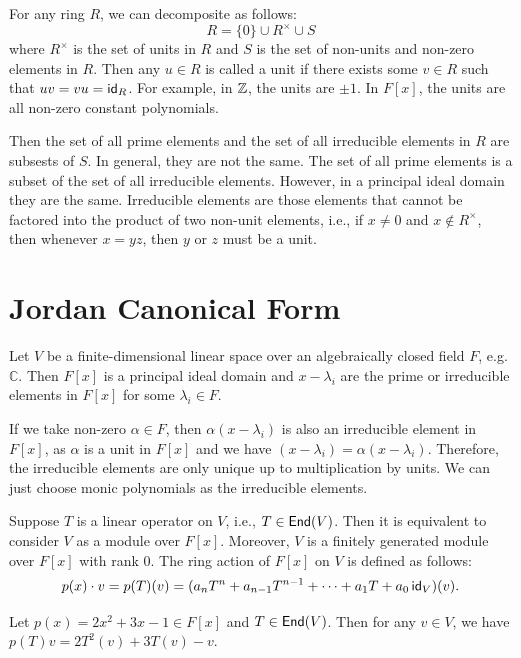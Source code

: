 For any ring $R$, we can decomposite as follows:
\[
  R = \{ 0 \} \cup R^{\times} \cup S
\]
where $R^{\times}$ is the set of units in $R$ and $S$ is the set of non-units and non-zero elements in $R$. Then any $u \in R$ is called a unit if there exists some $v \in R$ such that $uv = vu = \operatorname{\text{\normalfont\sffamily id}}_R$. For example, in $\operatorname{\mathbb{Z}}$, the units are $\pm 1$. In $F[x]$, the units are all non-zero constant polynomials.

Then the set of all prime elements and the set of all irreducible elements in $R$ are subsests of $S$. In general, they are not the same. The set of all prime elements is a subset of the set of all irreducible elements. However, in a principal ideal domain they are the same. Irreducible elements are those elements that cannot be factored into the product of two non-unit elements, i.e., if $x \neq 0$ and $x \notin R^{\times}$, then whenever $x = yz$, then $y$ or $z$ must be a unit.

\section{Jordan Canonical Form}

Let $V$ be a finite-dimensional linear space over an algebraically closed field $F$, e.g. $\mathbb{C}$. Then $F[x]$ is a principal ideal domain and $x - \lambda_i$ are the prime or irreducible elements in $F[x]$ for some $\lambda_i \in F$.
\begin{remark}
  If we take non-zero $\alpha \in F$, then $\alpha (x - \lambda_i)$ is also an irreducible element in $F[x]$, as $\alpha$ is a unit in $F[x]$ and we have $(x - \lambda_i) = \alpha(x - \lambda_i)$. Therefore, the irreducible elements are only unique up to multiplication by units. We can just choose monic polynomials as the irreducible elements.
\end{remark}

Suppose $T$ is a linear operator on $V$, i.e., $T \in \operatorname{\text{\normalfont\sffamily End}}(V)$. Then it is equivalent to consider $V$ as a module over $F[x]$. Moreover, $V$ is a finitely generated module over $F[x]$ with rank 0. The ring action of $F[x]$ on $V$ is defined as follows:
\[
  p(x) \cdot v = p(T)(v) = (a_n T^n + a_{n - 1} T^{n - 1} + \cdots + a_1 T + a_0 \operatorname{\text{\normalfont\sffamily id}}_V)(v).
\]

\begin{example}
  Let $p(x) = 2x^2 + 3x - 1 \in F[x]$ and $T \in \operatorname{\text{\normalfont\sffamily End}}(V)$. Then for any $v \in V$, we have $p(T) v = 2 T^2(v) + 3 T(v) - v$.
\end{example}

